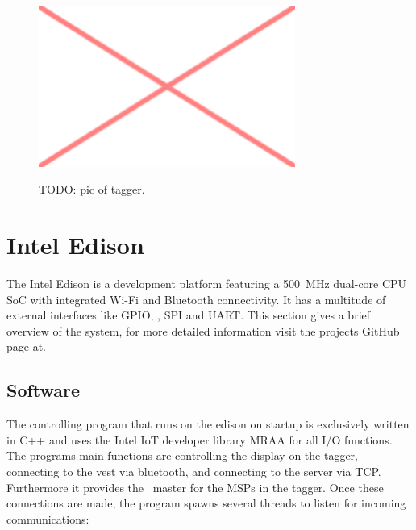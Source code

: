 \begin{figure}[h!]
\centering
\includegraphics[width=0.75\textwidth]{images/placeholder.png}\\
\caption[Edison Tagger]{TODO: pic of tagger.}
\label{fig:tag_ed_pic}
\end{figure}

\section{Intel Edison}
The Intel Edison is a development platform featuring a \SI{500}{\mega\hertz} dual-core CPU SoC with integrated Wi-Fi and Bluetooth connectivity. It has a multitude of external interfaces like GPIO, \isqc, SPI and UART. This section gives a brief overview of the system, for more detailed information visit the projects GitHub page at.

\subsection{Software}
The controlling program that runs on the edison on startup is exclusively written in C++ and uses the Intel IoT developer library MRAA for all I/O functions. The programs main functions are controlling the display on the tagger, connecting to the vest via bluetooth, and connecting to the server via TCP. Furthermore it provides the \isqc~master for the MSPs in the tagger. Once these connections are made, the program spawns several threads to listen for incoming communications:

